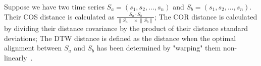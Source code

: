 Suppose we have two time series $S_a = (s_1,s_2, ... ,s_n)$ and $S_b = (s_1, s_2, ..., s_n)$.  Their COS distance is calculated as $\frac{S_{a}\cdot S_{b}}{\left \| S_{a}\right \|\times \left \| S_{b} \right \|}$;   The COR distance is calculated by dividing their distance covariance by the product of their distance standard deviations; The DTW distance is defined as the distance when the optimal alignment between $S_a$ and $S_b$ has been determined by "warping" them non-linearly~\cite{dtw}.


